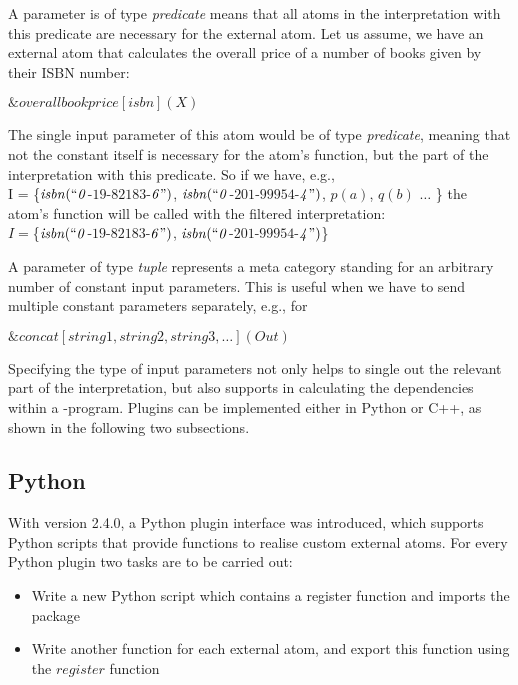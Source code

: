 \documentclass[a4paper, titlepage]{article}
\newcommand{\ext}[3]{\ensuremath{\&{\mathit{#1}}[#2](#3)}}
\newcommand\mycenterline[1]{\par\smallskip\centerline{#1} \smallskip}
\begin{document}
A parameter is of type \emph{predicate} means that 
all atoms in the interpretation with this predicate are 
necessary for the external atom. Let us assume, we have an external 
atom that calculates the overall price of a number of books 
given by their ISBN number:
\mycenterline{$\ext{overallbookprice}{isbn}{X}$}
The single input parameter of this atom would be of type 
\emph{predicate}, meaning that not the constant itself is 
necessary for the atom's function, but the part of the 
interpretation with this predicate. So if we have, e.g.,\\ 
I = \{$\mathit{isbn(``0}$-$\mathit{19}$-$\mathit{82183}$-$\mathit{6")}$, $ \mathit{isbn(``0}$-$\mathit{201}$-$\mathit{99954}$-$\mathit{4")}$, $p(a)$, $q(b)$ $\dots$ \}
the atom's function will be called with the filtered interpretation: \\
$I=$\{$\mathit{isbn(``0}$-$\mathit{19}$-$\mathit{82183}$-$\mathit{6")}$, $ \mathit{isbn(``0}$-$\mathit{201}$-$\mathit{99954}$-$\mathit{4")}$\}

A parameter of type \emph{tuple} represents a meta category standing for an arbitrary number of constant input parameters. This is useful when we have to send multiple constant parameters separately, e.g., for
\mycenterline{$\ext{concat}{string1, string2, string3, \dots}{Out}$}

Specifying the type of input parameters not only helps to 
single out the relevant part of the interpretation, but 
also supports \dlvhex{} in calculating the dependencies 
within a \hex-program. Plugins can be implemented either in Python or C++, as shown in the following two subsections.

\subsection{Python}
With \dlvhex{} version 2.4.0, a Python plugin interface was 
introduced, which supports Python scripts that provide 
functions to realise custom external atoms. For every Python plugin two tasks are to be carried out:
\begin{itemize}
\item Write a new Python script which contains a register function and imports the package \dlvhex{}
\item Write another function for each external atom, and export this function using the $\mathit{register}$ function 
\end{itemize}
\end{document}

